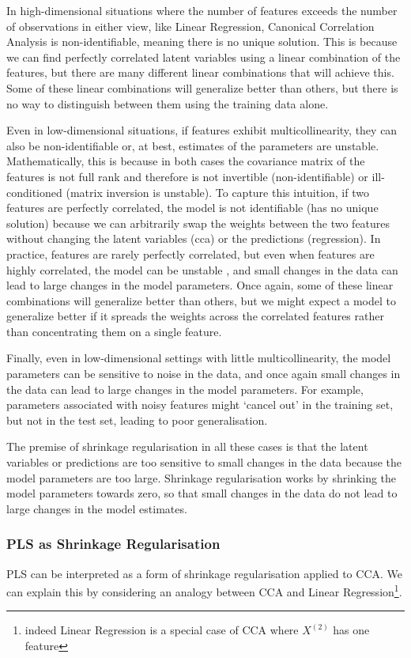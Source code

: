 In high-dimensional situations where the number of features exceeds the number of observations in either view, like Linear Regression, Canonical Correlation Analysis is non-identifiable, meaning there is no unique solution.
This is because we can find perfectly correlated latent variables using a linear combination of the features, but there are many different linear combinations that will achieve this.
Some of these linear combinations will generalize better than others, but there is no way to distinguish between them using the training data alone.

Even in low-dimensional situations, if features exhibit multicollinearity, they can also be non-identifiable or, at best, estimates of the parameters are unstable.
Mathematically, this is because in both cases the covariance matrix of the features is not full rank and therefore is not invertible (non-identifiable) or ill-conditioned (matrix inversion is unstable).
To capture this intuition, if two features are perfectly correlated, the model is not identifiable (has no unique solution) because we can arbitrarily swap the \gls{weights} between the two features without changing the latent variables (\acrshort{cca}) or the predictions (regression).
In practice, features are rarely perfectly correlated, but even when features are highly correlated, the model can be unstable \citep{mihalik2020multiple}, and small changes in the data can lead to large changes in the model parameters.
Once again, some of these linear combinations will generalize better than others, but we might expect a model to generalize better if it spreads the \gls{weights} across the correlated features rather than concentrating them on a single feature.

Finally, even in low-dimensional settings with little multicollinearity, the model parameters can be sensitive to noise in the data, and once again small changes in the data can lead to large changes in the model parameters.
For example, parameters associated with noisy features might `cancel out' in the training set, but not in the test set, leading to poor generalisation.

The premise of shrinkage regularisation in all these cases is that the latent variables or predictions are too sensitive to small changes in the data because the model parameters are too large.
Shrinkage regularisation works by shrinking the model parameters towards zero, so that small changes in the data do not lead to large changes in the model estimates.

\subsubsection{PLS as Shrinkage Regularisation} PLS can be interpreted as a form of shrinkage regularisation applied to CCA. We can explain this by considering an analogy between CCA and Linear Regression\footnote{indeed Linear Regression is a special case of CCA where \(X^{(2)}\) has one feature}.


